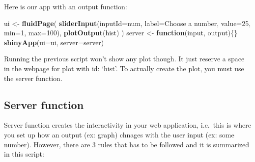 \documentclass[
]{book}
\newenvironment{Shaded}{\begin{snugshade}}{\end{snugshade}}
\newcommand{\CommentTok}[1]{\textcolor[rgb]{0.56,0.35,0.01}{\textit{#1}}}
\newcommand{\ControlFlowTok}[1]{\textcolor[rgb]{0.13,0.29,0.53}{\textbf{#1}}}
\newcommand{\DataTypeTok}[1]{\textcolor[rgb]{0.13,0.29,0.53}{#1}}
\newcommand{\DecValTok}[1]{\textcolor[rgb]{0.00,0.00,0.81}{#1}}
\newcommand{\KeywordTok}[1]{\textcolor[rgb]{0.13,0.29,0.53}{\textbf{#1}}}
\newcommand{\NormalTok}[1]{#1}
\newcommand{\OperatorTok}[1]{\textcolor[rgb]{0.81,0.36,0.00}{\textbf{#1}}}
\newcommand{\StringTok}[1]{\textcolor[rgb]{0.31,0.60,0.02}{#1}}
\begin{document}
Here is our app with an output function:

\begin{Shaded}
\begin{Highlighting}[]
\NormalTok{ui \textless{}{-}}\StringTok{ }\KeywordTok{fluidPage}\NormalTok{(}
  \KeywordTok{sliderInput}\NormalTok{(}\DataTypeTok{inputId=}\StringTok{\textquotesingle{}num\textquotesingle{}}\NormalTok{,}
              \DataTypeTok{label=}\StringTok{\textquotesingle{}Choose a number\textquotesingle{}}\NormalTok{,}
              \DataTypeTok{value=}\DecValTok{25}\NormalTok{, }\DataTypeTok{min=}\DecValTok{1}\NormalTok{, }\DataTypeTok{max=}\DecValTok{100}\NormalTok{),}
  \KeywordTok{plotOutput}\NormalTok{(}\StringTok{\textquotesingle{}hist\textquotesingle{}}\NormalTok{)}
\NormalTok{)}
\NormalTok{server \textless{}{-}}\StringTok{ }\ControlFlowTok{function}\NormalTok{(input, output)\{\}}
\KeywordTok{shinyApp}\NormalTok{(}\DataTypeTok{ui=}\NormalTok{ui, }\DataTypeTok{server=}\NormalTok{server)}
\end{Highlighting}
\end{Shaded}

Running the previous script won't show any plot though. It just reserve a space in the webpage for plot with id: `hist'. To actually create the plot, you must use the server function.

\hypertarget{server-function}{%
\subsection{Server function}\label{server-function}}

Server function creates the interactivity in your web application, i.e.~this is where you set up how an output (ex: graph) chnages with the user input (ex: some number). However, there are 3 rules that has to be followed and it is summarized in this script:

\begin{Shaded}
\end{Shaded}
\end{document}
